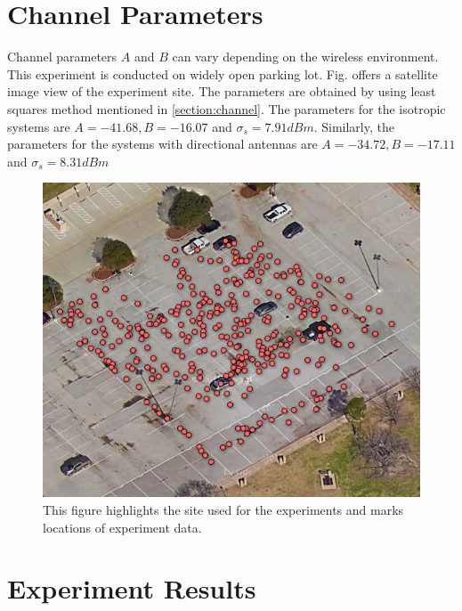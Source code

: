 \section{Channel Parameters}
Channel parameters $A$ and $B$ can vary depending on the wireless environment. This experiment is conducted on widely open parking lot. Fig.  offers a satellite image view of the experiment site.
The parameters are obtained by using least squares method mentioned in \ref{section:channel}. The parameters for the isotropic systems are $A = -41.68, B = -16.07$ and $\sigma_{s} = 7.91 dBm$. Similarly, the parameters for the systems with directional antennas are $A = -34.72, B = -17.11$ and $\sigma_{s} = 8.31 dBm$
\begin{figure}[]
	\centering
	\includegraphics[scale=1]{Figures/Googlemap.png}
	\caption{This figure highlights the site used for the experiments and marks locations of experiment data. }
	\label{figure: Googlemap}
\end{figure}

\section{Experiment Results}
